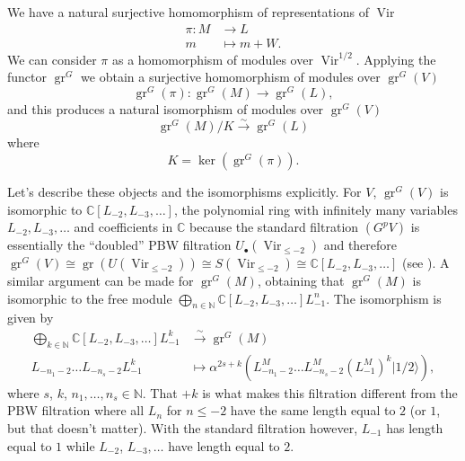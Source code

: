 \documentclass[12pt, a4paper]{article}
\DeclareMathOperator{\Vir}{Vir}
\DeclareMathOperator{\gr}{gr}
\newcommand{\vachalf}{|1/2\rangle}
\begin{document}
We have a natural surjective homomorphism of representations of $\Vir$
\begin{align*}
  \pi: M &\to L \\
  m &\mapsto m + W.
\end{align*}
We can consider $\pi$ as a homomorphism of modules over $\Vir^{1/2}$.
Applying the functor $\gr^G$ we obtain a surjective homomorphism of modules over $\gr^G(V)$
\begin{equation*}
  \gr^G(\pi): \gr^G(M) \to \gr^G(L),
\end{equation*}
and this produces a natural isomorphism of modules over $\gr^G(V)$
\begin{equation*}
  \gr^G(M)/K \xrightarrow{\sim} \gr^G(L)
\end{equation*}
where
\begin{equation*}
K = \ker(\gr^G(\pi)).
\end{equation*}

Let's describe these objects and the isomorphisms explicitly.
For $V$, $\gr^G(V)$ is isomorphic to $\mathbb{C}[L_{-2}, L_{-3}, \dots]$, the polynomial ring with infinitely many variables $L_{-2}, L_{-3}, \dots$ and coefficients in $\mathbb{C}$ because the standard filtration $(G^pV)$ is essentially the ``doubled'' PBW filtration $U_\bullet(\Vir_{\le -2})$ and therefore $\gr^G(V)\cong \gr(U(\Vir_{\le -2}))\cong S(\Vir_{\le -2})\cong \mathbb{C}[L_{-2}, L_{-3},\dots]$ (see \cite[Chapter 2]{dixmier_enveloping_1996}).
A similar argument can be made for $\gr^G(M)$, obtaining that $\gr^G(M)$ is isomorphic to the free module $\bigoplus_{n \in \mathbb{N}}\mathbb{C}[L_{-2}, L_{-3}, \dots]L_{-1}^n$.
The isomorphism is given by
\begin{align*}
  \bigoplus_{k \in \mathbb{N}}\mathbb{C}[L_{-2}, L_{-3}, \dots]L_{-1}^k &\xrightarrow{\sim} \gr^G(M) \\
  L_{-n_1 - 2}\dots L_{-n_s - 2}L_{-1}^k &\mapsto \alpha^{2s + k}(L_{-n_1 - 2}^M\dots L_{-n_s - 2}^M(L_{-1}^M)^k\vachalf),
\end{align*}
where $s$, $k$, $n_1,\dots, n_s \in \mathbb{N}$.
That $+k$ is what makes this filtration different from the PBW filtration where all $L_n$ for $n \le -2$ have the same length equal to $2$ (or $1$, but that doesn't matter).
With the standard filtration however, $L_{-1}$ has length equal to $1$ while $L_{-2}$, $L_{-3}, \dots$ have length equal to $2$.
\end{document}

